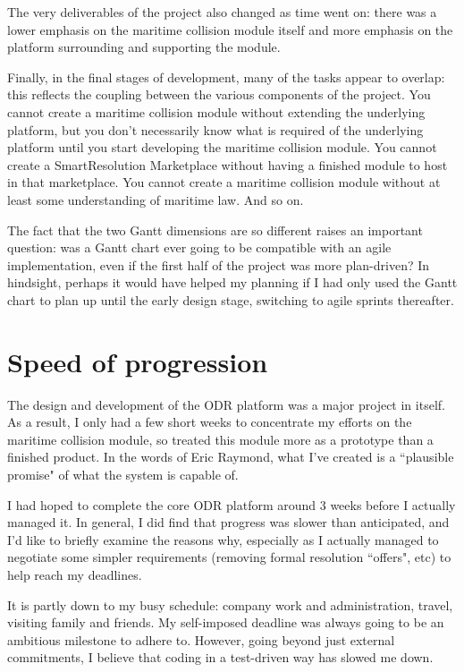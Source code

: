 The very deliverables of the project also changed as time went on: there was a lower emphasis on the maritime collision module itself and more emphasis on the platform surrounding and supporting the module.

Finally, in the final stages of development, many of the tasks appear to overlap: this reflects the coupling between the various components of the project. You cannot create a maritime collision module without extending the underlying platform, but you don't necessarily know what is required of the underlying platform until you start developing the maritime collision module. You cannot create a SmartResolution Marketplace without having a finished module to host in that marketplace. You cannot create a maritime collision module without at least some understanding of maritime law. And so on.

The fact that the two Gantt dimensions are so different raises an important question: was a Gantt chart ever going to be compatible with an agile implementation, even if the first half of the project was more plan-driven? In hindsight, perhaps it would have helped my planning if I had only used the Gantt chart to plan up until the early design stage, switching to agile sprints thereafter.

\section{Speed of progression}

The design and development of the ODR platform was a major project in itself. As a result, I only had a few short weeks to concentrate my efforts on the maritime collision module, so treated this module more as a prototype than a finished product. In the words of Eric Raymond, what I've created is a ``plausible promise" of what the system is capable of.~\cite{eric:catB}

I had hoped to complete the core ODR platform around 3 weeks before I actually managed it. In general, I did find that progress was slower than anticipated, and I'd like to briefly examine the reasons why, especially as I actually managed to negotiate some simpler requirements (removing formal resolution ``offers", etc) to help reach my deadlines.

It is partly down to my busy schedule: company work and administration, travel, visiting family and friends. My self-imposed deadline was always going to be an ambitious milestone to adhere to. However, going beyond just external commitments, I believe that coding in a test-driven way has slowed me down.

